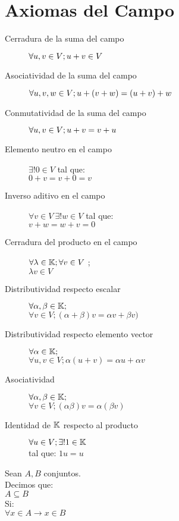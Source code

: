 %
%
%
%
%

%


%
\section{Axiomas del Campo}
\begin{description}
	\item[Cerradura de la suma del campo]$\forall u,v \in V;\\ u+v \in V$
	\item[Asociatividad de la suma del campo]$\forall u,v,w \in V;\\ u+(v+w) = (u+v)+w $ 
	\item[Conmutatividad de la suma del campo]$\forall u,v \in V;\\ u+v = v+u $
	\item[Elemento neutro en el campo]$\exists! 0 \in V$ tal que: \\ $  0 + v = v+0 = v $
	\item[Inverso aditivo en el campo]$\forall v \in V \  \exists! w \in V$ tal que: \\$ v + w = w + v = 0 $ 
	\item [Cerradura del producto en el campo] $\forall \lambda \in \mathbb{K};\forall v \in V$ ; \\ $\lambda v \in V$
	\item[Distributividad respecto escalar] $\forall \alpha , \beta \in \mathbb{K};$ \\ $\forall v \in V; (\alpha + \beta )v = \alpha v + \beta v)$
	\item [Distributividad respecto elemento vector] $\forall \alpha \in \mathbb{K};$ \\ $  \forall u,v \in V; \alpha (u+v)= \alpha u + \alpha v$  
	\item [Asociatividad] $\forall \alpha, \beta \in \mathbb{K};$ \\ $\forall v \in V; (\alpha\beta)v = \alpha(\beta v) $
	\item [Identidad de $\mathbb{K}$ respecto al producto]$\forall u \in V; \exists! 1 \in \mathbb{K}$\\ tal que:  $1u= u$
\end{description}	
\begin{defin}
Sean $A,B$ conjuntos.\\ Decimos que:\\
$A \subseteq B$ \\
Si: \\
$\forall x \in A \rightarrow x \in B$
\end{defin}

%
%

